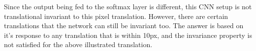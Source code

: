 \documentclass[parskip=half]{scrartcl}
\begin{document}
        Since the output being fed to the softmax layer is different, this CNN setup is not translational invariant to this pixel translation. However, there are certain translations that the network can still be invariant too. The answer is based on it's response to any translation that is within 10px, and the invariance property is not satisfied for the above illustrated translation.



\end{document}
